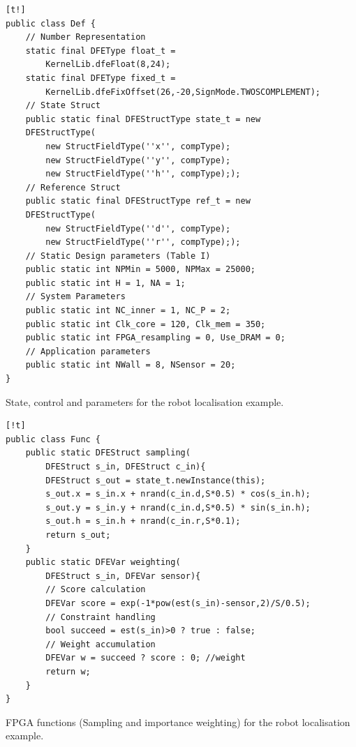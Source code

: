 \begin{Code}
    \centering
\lstset{language=Java,
        basicstyle=\ttfamily\small,
				tabsize=2,
				numbers=left,
				numberstyle=\tiny,
				frame=tb,
				columns=fullflexible,
				showstringspaces=false
				}
\begin{lstlisting}[][t!]
public class Def {
	// Number Representation
	static final DFEType float_t = 
		KernelLib.dfeFloat(8,24);
	static final DFEType fixed_t = 
		KernelLib.dfeFixOffset(26,-20,SignMode.TWOSCOMPLEMENT);
	// State Struct
	public static final DFEStructType state_t = new 
	DFEStructType(
		new StructFieldType(''x'', compType);
		new StructFieldType(''y'', compType);
		new StructFieldType(''h'', compType););
	// Reference Struct
	public static final DFEStructType ref_t = new 
	DFEStructType(
		new StructFieldType(''d'', compType);
		new StructFieldType(''r'', compType););
	// Static Design parameters (Table I)
	public static int NPMin = 5000, NPMax = 25000;
	public static int H = 1, NA = 1;
	// System Parameters
	public static int NC_inner = 1, NC_P = 2;
	public static int Clk_core = 120, Clk_mem = 350;
	public static int FPGA_resampling = 0, Use_DRAM = 0;
	// Application parameters
	public static int NWall = 8, NSensor = 20;
}
\end{lstlisting}
\caption{\small State, control and parameters for the robot localisation example.}
\label{lst:def}
\end{Code}

\begin{Code}
\centering
\lstset{language=Java,
        basicstyle=\ttfamily\small,
				tabsize=2,
				numbers=left,
				numberstyle=\tiny,
				frame=tb,
				columns=fullflexible,
				showstringspaces=false
				}
\begin{lstlisting}[][!t]
public class Func {
	public static DFEStruct sampling(
		DFEStruct s_in, DFEStruct c_in){
		DFEStruct s_out = state_t.newInstance(this);
		s_out.x = s_in.x + nrand(c_in.d,S*0.5) * cos(s_in.h);
		s_out.y = s_in.y + nrand(c_in.d,S*0.5) * sin(s_in.h);
		s_out.h = s_in.h + nrand(c_in.r,S*0.1);
		return s_out;
	}
	public static DFEVar weighting(
		DFEStruct s_in, DFEVar sensor){
		// Score calculation
		DFEVar score = exp(-1*pow(est(s_in)-sensor,2)/S/0.5);
		// Constraint handling
		bool succeed = est(s_in)>0 ? true : false;
		// Weight accumulation
		DFEVar w = succeed ? score : 0; //weight
		return w;
	}
}
\end{lstlisting}
\caption{\small FPGA functions (Sampling and importance weighting) for the robot localisation example.}
\label{lst:func}
\end{Code}


